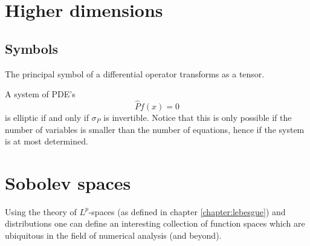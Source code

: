 \section{Higher dimensions}\label{pde:section:higher_dimensions}
\subsection{Symbols}


    \begin{property}
        The principal symbol of a differential operator transforms as a tensor.
    \end{property}
    \begin{definition}[Ellipticity]
        A system of PDE's \[\hat{P}f(x) = 0\] is elliptic if and only if $\sigma_P$ is invertible. Notice that this is only possible if the number of variables is smaller than the number of equations, hence if the system is at most determined.
    \end{definition}

\section{Sobolev spaces}

    Using the theory of $L^p$-spaces (as defined in chapter \ref{chapter:lebesgue}) and distributions one can define an interesting collection of function spaces which are ubiquitous in the field of numerical analysis (and beyond).

